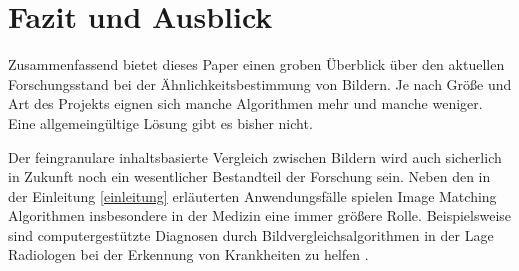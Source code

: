 \section{Fazit und Ausblick}\label{fazit-u-ausblick}
Zusammenfassend bietet dieses Paper einen groben Überblick über den aktuellen
Forschungsstand bei der Ähnlichkeitsbestimmung von Bildern. Je nach Größe und
Art des Projekts eignen sich manche Algorithmen mehr und manche weniger. Eine 
allgemeingültige Lösung gibt es bisher nicht.

Der feingranulare inhaltsbasierte Vergleich zwischen Bildern wird auch
sicherlich in Zukunft noch ein wesentlicher Bestandteil der Forschung sein.
Neben den in der Einleitung \ref{einleitung} erläuterten Anwendungsfälle spielen 
Image Matching Algorithmen insbesondere in der Medizin eine immer größere Rolle. 
Beispielsweise sind computergestützte Diagnosen durch Bildvergleichsalgorithmen
in der Lage Radiologen bei der Erkennung von Krankheiten zu helfen
\parencite{conclusion-medical}.